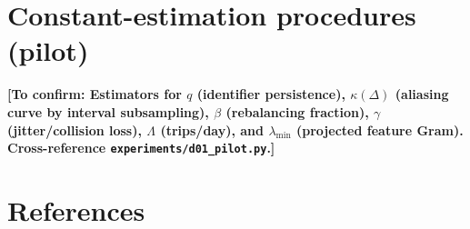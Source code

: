 \documentclass{iopjournal}
\theoremstyle{plain}
\theoremstyle{definition}
\theoremstyle{remark}
\newcommand{\Todo}[1]{\textbf{[To confirm: #1]}}
\begin{document}
\section{Constant-estimation procedures (pilot)}
\label{sec:si-C}

\Todo{Estimators for $q$ (identifier persistence), $\kappa(\Delta)$ (aliasing
curve by interval subsampling), $\beta$ (rebalancing fraction), $\gamma$
(jitter/collision loss), $\Lambda$ (trips/day), and $\lambda_{\min}$ (projected
feature Gram). Cross-reference \texttt{experiments/d01\_pilot.py}.}

\section*{References}

\end{document}
